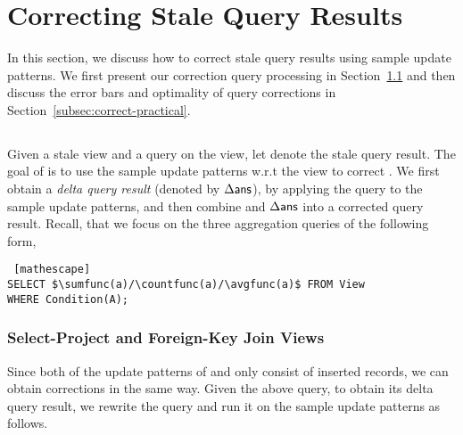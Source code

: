 
\section{Correcting Stale Query Results}
\label{correction}
In this section, we discuss how to correct stale query results using sample update patterns. We first present our correction query processing in Section~\ref{subsec:correct-principle} and then discuss the error bars and optimality of query corrections in Section~\ref{subsec:correct-practical}. 


\subsection{\Cqp}\label{subsec:correct-principle}
Given a stale view and a query on the view, let \ans denote the stale query result. The goal of \cqp is to use the sample update patterns w.r.t the view to correct \ans. We first obtain a \emph{delta query result} (denoted by $\Delta\textsf{ans}$), by applying the query to the sample update patterns, and then combine \ans and $\Delta\textsf{ans}$ into a corrected query result. Recall, that we focus on the three aggregation queries of the following form, 
\begin{lstlisting} [mathescape]
SELECT $\sumfunc(a)/\countfunc(a)/\avgfunc(a)$ FROM View 
WHERE Condition(A);
\end{lstlisting}








\subsubsection{Select-Project and Foreign-Key Join Views} \label{subsubsec:correct-spfj}
Since both of the update patterns of \spview and \fjview only consist of inserted records, we can obtain corrections in the same way. Given the above query, to obtain its delta query result, we rewrite the query and run it on the sample update patterns as follows.  

